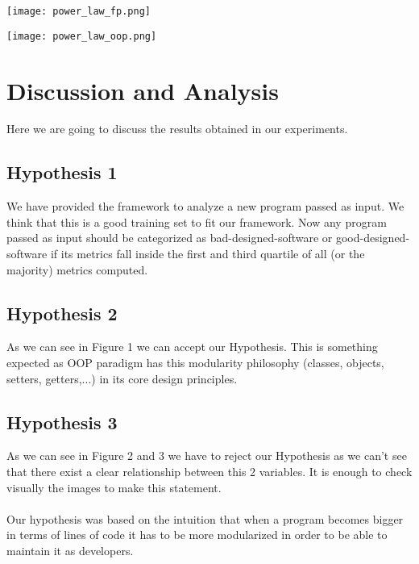 \documentclass[12pt, a4paper]{article}
\begin{document}
\begin{minipage}[t]{\linewidth}
    \texttt{[image: power\_law\_fp.png]}
    \captionsetup{type=figure}
    \label{fig:power_law_fp}
  \end{minipage}

  \begin{minipage}[t]{\linewidth}
    \texttt{[image: power\_law\_oop.png]}
    \captionsetup{type=figure}
    \label{fig:power_law_oop}
  \end{minipage}




\section{Discussion and Analysis}

Here we are going to discuss the results obtained in our experiments.

\subsection{Hypothesis 1}

We have provided the framework to analyze a new program passed as input. We think that this is a good training set to fit our framework. Now any program passed as input should be categorized as bad-designed-software or good-designed-software if its metrics fall inside the first and third quartile of all (or the majority) metrics computed.

\subsection{Hypothesis 2}

As we can see in Figure 1 we can accept our Hypothesis. This is something expected as OOP paradigm has this modularity philosophy (classes, objects, setters, getters,...) in its core design principles. 

\subsection{Hypothesis 3}

As we can see in Figure 2 and 3 we have to reject our Hypothesis as we can't see that there exist a clear relationship between this 2 variables. It is enough to check visually the images to make this statement. \\ \\ Our hypothesis was based on the intuition that when a program becomes bigger in terms of lines of code it has to be more modularized in order to be able to maintain it as developers.
\end{document}
